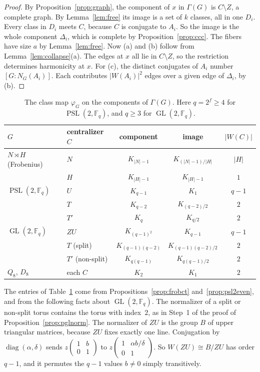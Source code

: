 \documentclass[12pt,letterpaper]{article}
\numberwithin{equation}{section}
\theoremstyle{plain}
\theoremstyle{definition}
\newcommand{\F}{\mathbb{F}}
\DeclareMathOperator{\GL}{GL}
\DeclareMathOperator{\PSL}{PSL}
\DeclareMathOperator{\diag}{diag}
\begin{document}
\begin{proof}
By Proposition~\ref{prop:graph}, the component of $x$ in $\Gamma(G)$ is
$C\setminus Z$, a complete graph. By Lemma~\ref{lem:free} its image is a set
of $k$ classes, all in one $D_i$. Every class in $D_i$ meets $C$, because
$C$ is conjugate to $A_i$. So the image is the whole component $\Delta_i$,
which is complete by Proposition~\ref{prop:ccc}. The fibers have size $a$ by
Lemma~\ref{lem:free}. Now (a) and (b) follow from
Lemma~\ref{lem:collapse}(a). The edges at $x$ all lie in $C\setminus Z$, so
the restriction determines harmonicity at $x$. For (c), the distinct
conjugates of $A_i$ number $[G:N_G(A_i)]$. Each contributes $|W(A_i)|^2$
edges over a given edge of $\Delta_i$, by (b).
\end{proof}

\begin{table}[ht]
\centering
\caption{The class map $\varphi_G$ on the components of $\Gamma(G)$. Here
$q=2^f\ge4$ for $\PSL(2,\F_q)$, and $q\ge3$ for $\GL(2,\F_q)$.}
\label{tab:harmonic}
\renewcommand{\arraystretch}{1.15}
\begin{tabular}{llccc}
\toprule
$G$ & centralizer $C$ & component & image & $|W(C)|$\\
\midrule
$N\rtimes H$ (Frobenius) & $N$ & $K_{|N|-1}$ & $K_{(|N|-1)/|H|}$ & $|H|$\\
& $H$ & $K_{|H|-1}$ & $K_{|H|-1}$ & $1$\\
$\PSL(2,\F_q)$ & $U$ & $K_{q-1}$ & $K_1$ & $q-1$\\
& $T$ & $K_{q-2}$ & $K_{(q-2)/2}$ & $2$\\
& $T'$ & $K_{q}$ & $K_{q/2}$ & $2$\\
$\GL(2,\F_q)$ & $ZU$ & $K_{(q-1)^2}$ & $K_{q-1}$ & $q-1$\\
& $T$ (split) & $K_{(q-1)(q-2)}$ & $K_{(q-1)(q-2)/2}$ & $2$\\
& $T'$ (non-split) & $K_{q(q-1)}$ & $K_{q(q-1)/2}$ & $2$\\
$Q_8$, $D_8$ & each $C$ & $K_2$ & $K_1$ & $2$\\
\bottomrule
\end{tabular}
\end{table}

The entries of Table~\ref{tab:harmonic} come from
Propositions~\ref{prop:frobct} and~\ref{prop:psl2even}, and from the
following facts about $\GL(2,\F_q)$. The normalizer of a split or non-split
torus contains the torus with index~$2$, as in Step~1 of the proof of
Proposition~\ref{prop:pglnorm}. The normalizer of $ZU$ is the group $B$ of
upper triangular matrices, because $ZU$ fixes exactly one line. Conjugation
by $\diag(\alpha,\delta)$ sends $z\left(\begin{smallmatrix}1&b\\0&1
\end{smallmatrix}\right)$ to $z\left(\begin{smallmatrix}1&\alpha b/\delta\\
0&1\end{smallmatrix}\right)$. So $W(ZU)\cong B/ZU$ has order $q-1$, and it
permutes the $q-1$ values $b\ne0$ simply transitively.
\end{document}
